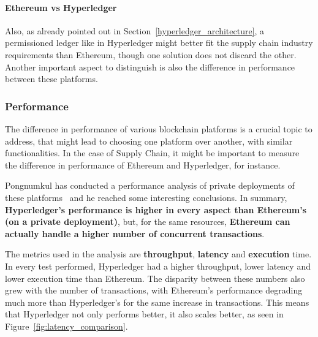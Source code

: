 \paragraph{Ethereum vs Hyperledger} Also, as already pointed out in Section~\ref{hyperledger_architecture}, a permissioned ledger like in Hyperledger might better fit the supply chain industry requirements than Ethereum, though one solution does not discard the other. Another important aspect to distinguish is also the difference in performance between these platforms.



\subsubsection{Performance}
\label{sec-performance-comparison}
The difference in performance of various blockchain platforms is a crucial topic to address, that might lead to choosing one platform over another, with similar functionalities. In the case of Supply Chain, it might be important to measure the difference in performance of Ethereum and Hyperledger, for instance. 

Pongnumkul has conducted a performance analysis of private deployments of these platforms~\cite{Pongnumkul2017} and he reached some interesting conclusions. In summary, \textbf{Hyperledger's performance is higher in every aspect than Ethereum's (on a private deployment)}, but, for the same resources, \textbf{Ethereum can actually handle a higher number of concurrent transactions}. 

The metrics used in the analysis are \textbf{throughput}, \textbf{latency} and \textbf{execution} time.
In every test performed, Hyperledger had a higher throughput, lower latency and lower execution time than Ethereum. The disparity between these numbers also grew with the number of transactions, with Ethereum's performance degrading much more than Hyperledger's for the same increase in transactions. This means that Hyperledger not only performs better, it also scales better, as seen in Figure~\ref{fig:latency_comparison}.

